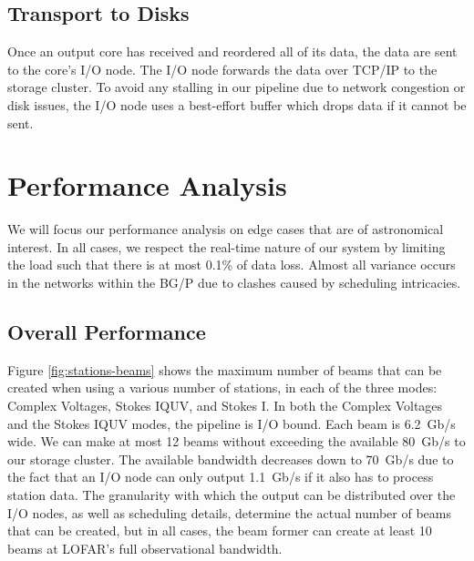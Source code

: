 \documentclass{llncs}
\begin{document}
\subsection{Transport to Disks}
Once an output core has received and reordered all of its data, the data are sent to the core's I/O node. The I/O node forwards the data over TCP/IP to the storage cluster. To avoid any stalling in our pipeline due to network congestion or disk issues, the I/O node uses a best-effort buffer which drops data if it cannot be sent.


\section{Performance Analysis}

We will focus our performance analysis on edge cases that are of astronomical interest. In all cases, we respect the real-time nature of our system by limiting the load such that there is at most 0.1\% of data loss. Almost all variance occurs in the networks within the BG/P due to clashes caused by scheduling intricacies.

\subsection{Overall Performance}

Figure \ref{fig:stations-beams} shows the maximum number of beams that can be created when using a various number of stations, in each of the three modes: Complex Voltages, Stokes IQUV, and Stokes I. In both the Complex Voltages and the Stokes IQUV modes, the pipeline is I/O bound. Each beam is 6.2~Gb/s wide. We can make at most 12 beams without exceeding the available 80~Gb/s to our storage cluster. The available bandwidth decreases down to 70~Gb/s due to the fact that an I/O node can only output 1.1~Gb/s if it also has to process station data. The granularity with which the output can be distributed over the I/O nodes, as well as scheduling details, determine the actual number of beams that can be created, but in all cases, the beam former can create at least 10 beams at LOFAR's full observational bandwidth.
\end{document}
